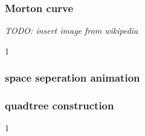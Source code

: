 \documentclass{beamer}
\begin{document}
\begin{frame}
    \frametitle{Morton curve}
    \textit{TODO: insert image from wikipedia}
\end{frame}


\begin{frame}
    \resizebox{\textwidth}{!}{%
        
    }
\end{frame}


\begin{frame}
    \resizebox{\textwidth}{!}{%
        
    }
\end{frame}


\begin{frame}
    \resizebox{\textwidth}{!}{%
        
    }
\end{frame}


\begin{frame}
    \resizebox{\textwidth}{!}{%
        
    }
\end{frame}


\begin{frame}
\begin{animateinline}[%
    controls={step},
    buttonsize=10pt
]{1}
\end{animateinline}
\end{frame}


\begin{frame}
    \frametitle{space seperation animation}
    \begin{center}
    \end{center}
\end{frame}


\begin{frame}
    \frametitle{quadtree construction}
    \begin{center}
    \end{center}
\end{frame}


\begin{frame}
\begin{animateinline}[%
    controls={step},
    buttonsize=10pt
]{1}
\end{animateinline}
\end{frame}
\end{document}
